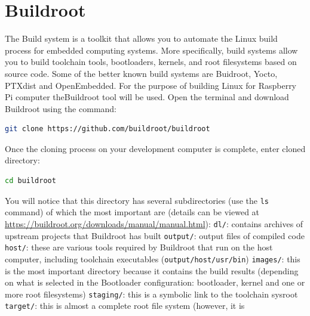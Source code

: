 \documentclass[11pt]{article}
\begin{document}
\section{Buildroot}
The Build system is a toolkit that allows you to automate the Linux build
 process for embedded computing systems. More specifically, build systems allow
 you to build toolchain tools, bootloaders, kernels, and root filesystems based
 on source code. Some of the better known build systems are Buidroot, Yocto,
 PTXdist and OpenEmbedded.
\newline
\newline
For the purpose of building Linux for Raspberry Pi computer theBuildroot tool
 will be used. Open the terminal and download Buildroot using the command:
\begin{lstlisting}[language=bash]
git clone https://github.com/buildroot/buildroot
\end{lstlisting}
Once the cloning process on your development computer is complete, enter
cloned directory:
\begin{lstlisting}[language=bash]
cd buildroot
\end{lstlisting}
You will notice that this directory has several subdirectories (use the
 \texttt{ls} command) of which the most important are (details can be viewed at
 \url{https://buildroot.org/downloads/manual/manual.html}):
\newline
\newline
\texttt{dl/}: contains archives of upstream projects that Buildroot has built
\newline
\newline
\texttt{output/}: output files of compiled code
\newline
\newline
\texttt{host/}: these are various tools required by Buildroot that run on the
 host computer, including toolchain executables
 (\texttt{output/host/usr/bin})
\newline
\newline
\texttt{images/}: this is the most important directory because it contains the
 build results (depending on what is selected in the Bootloader configuration:
 bootloader, kernel and one or more root filesystems)
\newline
\newline
\texttt{staging/}: this is a symbolic link to the toolchain sysroot
\newline
\newline
\texttt{target/}: this is almost a complete root file system (however, it is
\end{document}
